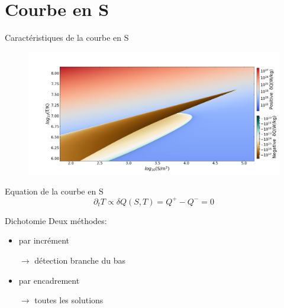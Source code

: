 \documentclass{beamer}
\begin{document}
\section{Courbe en S}

\begin{frame}{Caractéristiques de la courbe en S}
    \begin{figure}
        \centering
        \includegraphics[width=\linewidth]{Space_pos_neg.png}
        \label{Fig:Sneg}
    \end{figure}

    \begin{block}{Equation de la courbe en S}
      \begin{equation*}
        \partial_t T \propto \delta Q (S, T) = Q^{+} - Q^{-} = 0
      \end{equation*}
    \end{block}
\end{frame}

\begin{frame}{Dichotomie}
    Deux méthodes:
    \begin{itemize}
        \item par incrément
        \setlength{\itemindent}{2em}
        \item[$\rightarrow$] détection branche du bas
        \setlength{\itemindent}{0em}
        \item par encadrement
        \setlength{\itemindent}{2em}
        \item[$\rightarrow$] toutes les solutions
    \end{itemize}
\end{frame}
\end{document}
